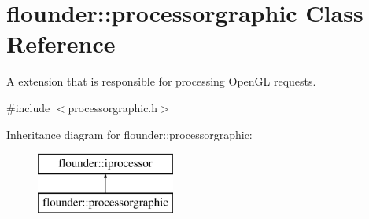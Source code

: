 \hypertarget{classflounder_1_1processorgraphic}{}\section{flounder\+:\+:processorgraphic Class Reference}
\label{classflounder_1_1processorgraphic}


A extension that is responsible for processing Open\+GL requests.  




{\ttfamily \#include $<$processorgraphic.\+h$>$}

Inheritance diagram for flounder\+:\+:processorgraphic\+:\begin{figure}[H]
\begin{center}
\leavevmode
\includegraphics[height=2.000000cm]{classflounder_1_1processorgraphic}
\end{center}
\end{figure}

